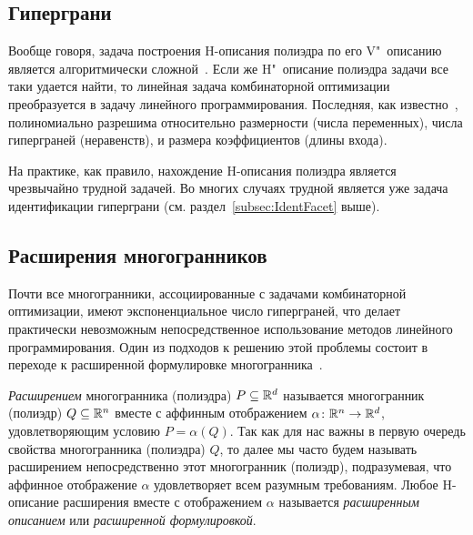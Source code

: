 \subsection{Гиперграни} %

Вообще говоря, задача построения H-описания полиэдра по его V"~описанию является алгоритмически сложной~\cite{Khachiyan:2008}.
Если же H"~описание полиэдра задачи все таки удается найти, то линейная задача комбинаторной оптимизации преобразуется в задачу линейного программирования. Последняя, как известно~\cite{Khachiyan:1979, Karmarkar:1984}, полиномиально разрешима относительно размерности (числа переменных), числа гиперграней (неравенств), и размера коэффициентов (длины входа).

На практике, как правило, нахождение H-описания полиэдра является чрезвычайно трудной задачей.
Во многих случаях трудной является уже задача идентификации гиперграни (см. раздел~\ref{subsec:IdentFacet} выше).

\begin{comment}
Заметим также, что для решения линейной задачи комбинаторной оптимизации методами линейного программирования не обязательно наличие H-описания многогранника задачи.
В 1982 году Карп и Пападимитриу показали~\cite{KarpP:1982}, что для эффективного решения такой задачи достаточно иметь эффективный алгоритм решения задачи отделимости: для заданного многогранника $P$ и вектора $\bm{v}$ с рациональными координатами
определить, принадлежит ли вектор многограннику
и, если не принадлежит, то сгенерировать гиперплоскость (линейное неравенство), отсекающую $v$ от $P$.
\end{comment}

\subsection{Расширения многогранников}
\label{sec:Extension}

Почти все многогранники, ассоциированные с задачами комбинаторной оптимизации, имеют экспоненциальное число гиперграней, что делает практически невозможным непосредственное использование методов линейного программирования. 
Один из подходов к решению этой проблемы состоит в переходе к расширенной формулировке многогранника~\cite{Kaibel:2011,Conforti:2013}. 
 
\emph{Расширением} многогранника (полиэдра) $P \subseteq \mathbb{R}^d$ называется многогранник (полиэдр) $Q \subseteq \mathbb{R}^n$ вместе с аффинным отображением $\alpha \colon \mathbb{R}^n \to \mathbb{R}^d$, удовлетворяющим условию $P = \alpha(Q)$.
Так как для нас важны в первую очередь свойства многогранника (полиэдра) $Q$, то далее мы часто будем называть расширением непосредственно этот многогранник (полиэдр), подразумевая, что аффинное отображение $\alpha$ удовлетворяет всем разумным требованиям.
Любое H-описание расширения вместе с отображением $\alpha$ называется \emph{расширенным описанием} или \emph{расширенной формулировкой}.

